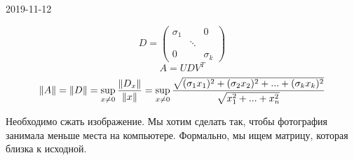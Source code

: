 \documentclass[main.tex]{subfiles}
\begin{document}
\begin{lect}{2019-11-12}
    \begin{Proof}
        \[D = \begin{pmatrix}
            \sigma_1 & & 0\\
                     &\ddots& \\
            0 & & \sigma_k
        \end{pmatrix}\]
        \[A = UDV^T\]
        \[\lVert A \rVert = \lVert D \rVert = \sup_{x \neq 0} \frac{\lVert D_x \rVert}{\lVert x \rVert} =
        \sup_{x \neq 0} \frac{\sqrt{(\sigma_1 x_1)^2 + (\sigma_2 x_2)^2 + ... +
    (\sigma_k x_k)^2}}{\sqrt{x_1^2 + ... + x_n^2}} \]
    \end{Proof}

    \begin{task}
        Необходимо сжать изображение. Мы хотим сделать так, чтобы
        фотография занимала меньше места на компьютере. Формально, мы ищем
        матрицу, которая близка к исходной.
    \end{task}


\end{lect}
\end{document}
